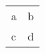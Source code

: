 \documentclass{article}
\begin{document}
\begin{tabular*}{2in}[t]{lr}
a & b\\
c & d\\
\end{tabular*}
\end{document}
